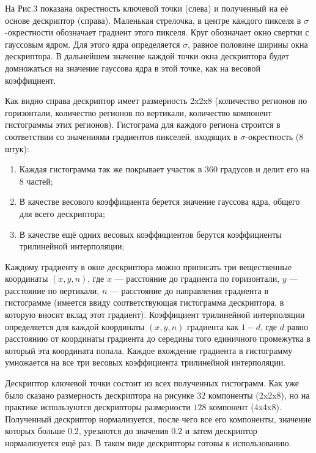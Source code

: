 На Рис.3 показана окрестность ключевой точки (слева) и полученный на её основе дескриптор (справа). Маленькая стрелочка, в центре каждого пикселя в $\sigma$-окрестности обозначает градиент этого пикселя. Круг обозначает окно свертки с гауссовым ядром. Для этого ядра определяется $\sigma$, равное половине ширины окна дескриптора. В дальнейшем значение каждой точки окна дескриптора будет домножаться на значение гауссова ядра в этой точке, как на весовой коэффициент.

\vspace{1em}

Как видно справа дескриптор имеет размерность 2x2x8 (количество регионов по горизонтали, количество регионов по вертикали, количество компонент гистограммы этих регионов). Гистограма для каждого региона строится в соответствии со значениями градиентов пикселей, входящих в  $\sigma$-окрестность (8 штук):

\begin{enumerate}
    \item Каждая гистограмма так же покрывает участок в 360 градусов и делит его на 8 частей;
    \item В качестве весового коэффициента берется значение гауссова ядра, общего для всего дескриптора;
    \item В качестве ещё одних весовых коэффициентов берутся коэффициенты трилинейной интерполяции;
\end{enumerate}

Каждому градиенту в окне дескриптора можно приписать три вещественные координаты $(x, y, n)$, где $x$ — расстояние до градиента по горизонтали, $y$ — расстояние по вертикали, $n$ — расстояние до направления градиента в гистограмме (имеется ввиду соответствующая гистограмма дескриптора, в которую вносит вклад этот градиент). Коэффициент трилинейной интерполяции определяется для каждой координаты $(x, y, n)$ градиента как $1-d$, где $d$ равно расстоянию от координаты градиента до середины того единичного промежутка в который эта координата попала. Каждое вхождение градиента в гистограмму умножается на все три весовых коэффициента трилинейной интерполяции.

\vspace{1em}

Дескриптор ключевой точки состоит из всех полученных гистограмм. Как уже было сказано размерность дескриптора на рисунке $32$ компоненты (2x2x8), но на практике используются дескрипторы размерности $128$ компонент (4x4x8). Полученный дескриптор нормализуется, после чего все его компоненты, значение которых больше $0.2$, урезаются до значения $0.2$ и затем дескриптор нормализуется ещё раз. В таком виде дескрипторы готовы к использованию.

\newpage